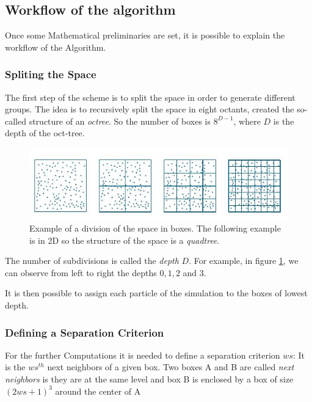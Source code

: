 \documentclass[11pt,twoside,a4paper]{report}
\begin{document}
	
	\subsection{Workflow of the algorithm}
	
	Once some Mathematical preliminaries are set, it is possible to explain the workflow of the Algorithm.
	
	\subsubsection{Spliting the Space}
	
	The first step of the scheme is to split the space in order to generate different groups. The idea is to recursively split the space in eight octants, created the so-called structure of an \textit{octree}. So the number of boxes is $8^{D-1}$, where $D$ is the depth of the oct-tree.
	
		
	
	\begin{figure}[H]
    \includegraphics[scale=0.9]{BoxDepth}    
    \centering 
    \caption{Example of a division of the space in boxes. The following example is in 2D so the structure of the space is a \textit{quadtree}.}    
    \label{fig:depth}
     \end{figure}
	
    
    The number of subdivisions is called the \textit{depth} $D$. For example, in figure \ref{fig:depth}, we can observe from left to right the depths $0,1,2$ and $3$.
    
    It is then possible to assign each particle of the simulation to the boxes of lowest depth.
    
	\subsubsection{Defining a Separation Criterion}
	
	For the further Computations it is needed to define a separation criterion $ws$: It is the $ws^{th}$ next neighbors of a given box. Two boxes A and B are called \textit{next neighbors} is they are at the same level and box B is enclosed by a box of size $(2 ws + 1)^3$ around the center of A 
	
\end{document}
